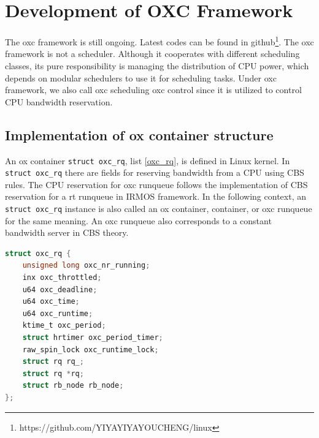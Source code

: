 \chapter{Development of OXC Framework\label{impl}}
The oxc framework is still ongoing. Latest codes can be found 
in github\footnote{https://github.com/YIYAYIYAYOUCHENG/linux}.
The oxc framework is not a scheduler. Although it cooperates with
different scheduling classes, its pure responsibility is managing 
the distribution of CPU power, which depends on modular schedulers 
to use it for scheduling tasks. Under oxc framework, we also call
oxc scheduling oxc control since it is utilized to control CPU 
bandwidth reservation.

\section{Implementation of ox container structure}
An ox container \texttt{struct oxc\_rq}, list \ref{oxc_rq}, is 
defined in Linux kernel. In \texttt{struct oxc\_rq} there are 
fields for reserving bandwidth from a CPU using CBS rules. The 
CPU reservation for oxc runqueue follows the implementation of 
CBS reservation for a rt runqueue in IRMOS framework. In the 
following context, an \texttt{struct oxc\_rq} instance is also 
called an ox container, container, or oxc runqueue for the same 
meaning. An oxc runqueue also corresponds to a constant bandwidth 
server in CBS theory. 
\begin{lstlisting}[language=C, caption={\texttt{struct oxc\_rq}},
                        label={oxc_rq}]
struct oxc_rq {
	unsigned long oxc_nr_running;
	inx oxc_throttled;
	u64 oxc_deadline;
	u64 oxc_time;
	u64 oxc_runtime;
	ktime_t oxc_period;
	struct hrtimer oxc_period_timer;
	raw_spin_lock oxc_runtime_lock;
	struct rq rq_;
	struct rq *rq;
	struct rb_node rb_node;
};
\end{lstlisting}

